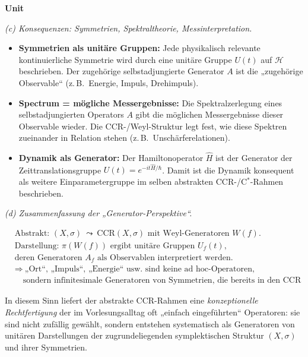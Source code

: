 \documentclass[10pt, letterpaper]{article}
\newenvironment{unit}[1]
  {\begin{unitbox}\textbf{Unit #1}\par\smallskip}
  {\end{unitbox}}
\begin{document}
\begin{unit}
\medskip

\emph{(c) Konsequenzen: Symmetrien, Spektraltheorie, Messinterpretation.}

\begin{itemize}
  \item \textbf{Symmetrien als unitäre Gruppen:}
        Jede physikalisch relevante kontinuierliche Symmetrie
        wird durch eine unitäre Gruppe \(U(t)\) auf \(\mathcal{H}\) beschrieben.
        Der zugehörige selbstadjungierte Generator \(A\) ist die „zugehörige Observable“
        (z.\,B.\ Energie, Impuls, Drehimpuls).

  \item \textbf{Spectrum = mögliche Messergebnisse:}
        Die Spektralzerlegung eines selbstadjungierten Operators \(A\)
        gibt die möglichen Messergebnisse dieser Observable wieder.
        Die CCR-/Weyl-Struktur legt fest, wie diese Spektren
        zueinander in Relation stehen (z.\,B.\ Unschärferelationen).

  \item \textbf{Dynamik als Generator:}
        Der Hamiltonoperator \(\hat{H}\) ist der Generator der Zeittranslationsgruppe
        \(U(t)=e^{-i t\hat{H}/\hbar}\).
        Damit ist die Dynamik konsequent als weitere Einparametergruppe
        im selben abstrakten CCR-/C$^\ast$-Rahmen beschrieben.
\end{itemize}

\medskip

\emph{(d) Zusammenfassung der „Generator-Perspektive“.}

\[
\boxed{
\begin{aligned}
&\text{Abstrakt: } (X,\sigma)\ \leadsto\ \mathrm{CCR}(X,\sigma)
\text{ mit Weyl-Generatoren }W(f).\\[4pt]
&\text{Darstellung: } \pi(W(f)) \text{ ergibt unitäre Gruppen }U_f(t),\\
&\text{deren Generatoren }A_f \text{ als Observablen interpretiert werden.}\\[4pt]
&\Rightarrow\ \text{„Ort“, „Impuls“, „Energie“ usw.\ sind keine ad hoc-Operatoren,}\\
&\quad\text{sondern infinitesimale Generatoren von Symmetrien, die bereits in den CCR stecken.}
\end{aligned}
}
\]

In diesem Sinn liefert der abstrakte CCR-Rahmen eine \emph{konzeptionelle Rechtfertigung}
der im Vorlesungsalltag oft „einfach eingeführten“ Operatoren:
sie sind nicht zufällig gewählt, sondern entstehen systematisch als Generatoren
von unitären Darstellungen der zugrundeliegenden symplektischen Struktur \((X,\sigma)\)
und ihrer Symmetrien.

\end{unit}
\end{document}
